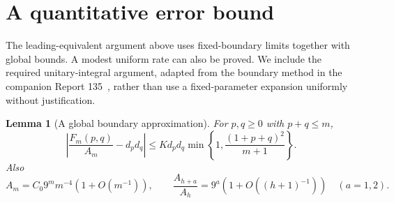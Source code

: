 \documentclass[11pt,letterpaper]{article}
\newtheorem{lemma}[theorem]{Lemma}
\theoremstyle{remark}\newtheorem{remark}[theorem]{Remark}
\numberwithin{equation}{section}
\begin{document}
\section{A quantitative error bound}\label{upo:1243:sec:rate}
The leading-equivalent argument above uses fixed-boundary limits together
with global bounds.
A modest uniform rate can also be proved. We include the required
unitary-integral argument, adapted from the boundary method in the
companion Report 135~\cite{R135}, rather than use a fixed-parameter
expansion uniformly without justification.

\begin{lemma}[A global boundary approximation]\label{upo:1243:lem:global-rate}
For $p,q\ge0$ with $p+q\le m$,
\begin{equation}\label{upo:1243:eq:global-F-rate}
 \left|\frac{F_m(p,q)}{A_m}-d_pd_q\right|
 \le Kd_pd_q\min\left\{1,\frac{(1+p+q)^2}{m+1}\right\}.
\end{equation}
Also
\begin{equation}\label{upo:1243:eq:A-rate}
 A_m=C_0 9^m m^{-4}(1+O(m^{-1})),
 \qquad \frac{A_{h+a}}{A_h}=9^a(1+O((h+1)^{-1}))\quad(a=1,2).
\end{equation}
\end{lemma}
\end{document}
